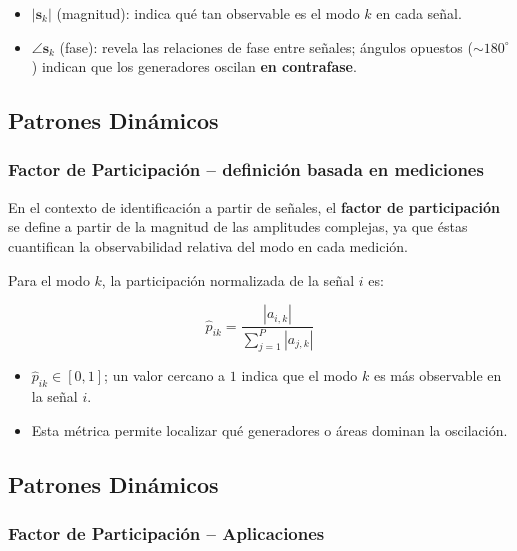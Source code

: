 \begin{itemize}
    \item $|\mathbf{s}_k|$ (magnitud): indica qué tan observable es el modo $k$ en cada señal.
    \item $\angle\mathbf{s}_k$ (fase): revela las relaciones de fase entre señales;
          ángulos opuestos ($\sim 180^\circ$) indican que los generadores oscilan \textbf{en contrafase}.
\end{itemize}


\subsection{Patrones Dinámicos}
\subsubsection{Factor de Participación – definición basada en mediciones}

En el contexto de identificación a partir de señales, el \textbf{factor de participación}
se define a partir de la magnitud de las amplitudes complejas,
ya que éstas cuantifican la observabilidad relativa del modo en cada medición.

Para el modo $k$, la participación normalizada de la señal $i$ es:

\begin{equation}
    \boxed{\hat{p}_{ik} = \frac{|a_{i,k}|}{\displaystyle\sum_{j=1}^{P} |a_{j,k}|}}
    \label{eq:pf_mediciones}
\end{equation}

\begin{itemize}
    \item $\hat{p}_{ik} \in [0,1]$; un valor cercano a $1$ indica que el modo $k$
          es más observable en la señal $i$.
    \item Esta métrica permite localizar qué generadores o áreas dominan la oscilación.

\end{itemize}


\subsection{Patrones Dinámicos}
\subsubsection{Factor de Participación – Aplicaciones}

